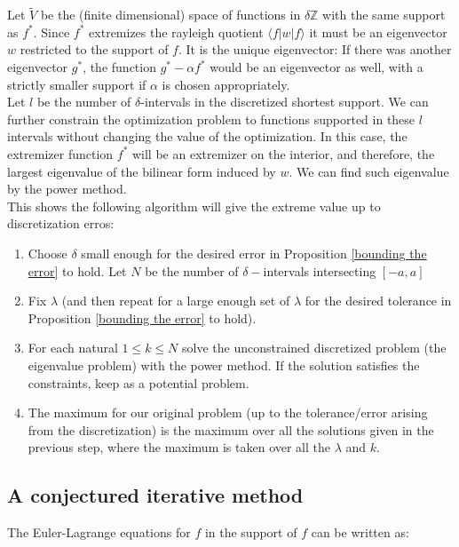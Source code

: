 Let $\tilde V$ be the (finite dimensional) space of functions in $\delta \mathbb Z$ with the same support as $f^*$. Since $f^*$ extremizes the rayleigh quotient $\langle f|w|f\rangle$  it must be an eigenvector $w$ restricted to the support of $f$. It is the unique eigenvector: If there was another eigenvector $g^*$, the function $g^*-\alpha f^*$ would be an eigenvector as well, with a strictly smaller support if $\alpha$ is chosen appropriately.\\

Let $l$ be the number of $\delta$-intervals in the discretized shortest support. We can further constrain the optimization problem to functions supported in these $l$ intervals without changing the value of the optimization. In this case, the extremizer function $f^*$ will be an extremizer on the interior, and therefore, the largest eigenvalue of the bilinear form induced by $w$. We can find such eigenvalue by the power method.\\



This shows the following algorithm will give the extreme value up to discretization erros:

\begin{enumerate}
	\item Choose $\delta$ small enough for the desired error in Proposition \ref{bounding the error} to hold. Let $N$ be the number of $\delta-$intervals intersecting $[-a,a]$
	\item Fix $\lambda$ (and then repeat for a large enough set of $\lambda$ for the desired tolerance in Proposition \ref{bounding the error} to hold).
    \item For each natural $1\le k\le N$ solve the unconstrained discretized problem (the eigenvalue problem) with the power method. If the solution satisfies the constraints, keep as a potential problem.
    \item The maximum for our original problem (up to the tolerance/error arising from the discretization) is the maximum over all the solutions given in the previous step, where the maximum is taken over all the $\lambda$ and $k$.
\end{enumerate}

\subsection{A conjectured iterative method}


The Euler-Lagrange equations for $f$ in the support of $f$ can be written as:


